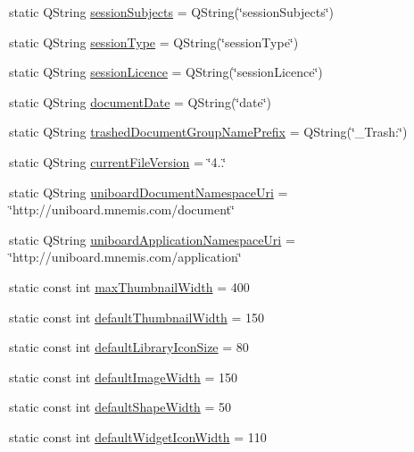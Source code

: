 \begin{DoxyCompactItemize}
static Q\-String \hyperlink{class_u_b_settings_a1dc8e4fbe35dfece6037896731af8a5c}{session\-Subjects} = Q\-String(\char`\"{}session\-Subjects\char`\"{})
\item 
static Q\-String \hyperlink{class_u_b_settings_ad3493cc837846b1736c44fc02658420f}{session\-Type} = Q\-String(\char`\"{}session\-Type\char`\"{})
\item 
static Q\-String \hyperlink{class_u_b_settings_a6f486e7b7b356cd99f419eb6c5e3755d}{session\-Licence} = Q\-String(\char`\"{}session\-Licence\char`\"{})
\item 
static Q\-String \hyperlink{class_u_b_settings_ac6c81f3415f2a306cd298f729cba4b1d}{document\-Date} = Q\-String(\char`\"{}date\char`\"{})
\item 
static Q\-String \hyperlink{class_u_b_settings_a0e7fcd8a39b252af1670c0a099ad26cc}{trashed\-Document\-Group\-Name\-Prefix} = Q\-String(\char`\"{}\-\_\-\-Trash\-:\char`\"{})
\item 
static Q\-String \hyperlink{class_u_b_settings_a3aa1126a8aaeb41a39c42a9952ba3cdd}{current\-File\-Version} = \char`\"{}4..\char`\"{}
\item 
static Q\-String \hyperlink{class_u_b_settings_a17fa3676f5ab483e7125b9ed2c3dfef4}{uniboard\-Document\-Namespace\-Uri} = \char`\"{}http\-://uniboard.\-mnemis.\-com/document\char`\"{}
\item 
static Q\-String \hyperlink{class_u_b_settings_a20733676315376a77a45d82895e592a9}{uniboard\-Application\-Namespace\-Uri} = \char`\"{}http\-://uniboard.\-mnemis.\-com/application\char`\"{}
\item 
static const int \hyperlink{class_u_b_settings_a7baff769a2e029fd39bebab986daf29f}{max\-Thumbnail\-Width} = 400
\item 
static const int \hyperlink{class_u_b_settings_ab24f23ee045a939cacac49c1d9669220}{default\-Thumbnail\-Width} = 150
\item 
static const int \hyperlink{class_u_b_settings_ab45c93d398ec2d37a65a8e463a7734d1}{default\-Library\-Icon\-Size} = 80
\item 
static const int \hyperlink{class_u_b_settings_a2544c7a176904cf329a239a6352c77ed}{default\-Image\-Width} = 150
\item 
static const int \hyperlink{class_u_b_settings_a717ca3e6f874a3b6a2e674016a74862d}{default\-Shape\-Width} = 50
\item 
static const int \hyperlink{class_u_b_settings_a4dd74f823ed8465998d8d4f701e6fdfd}{default\-Widget\-Icon\-Width} = 110
\item 

\end{DoxyCompactItemize}
